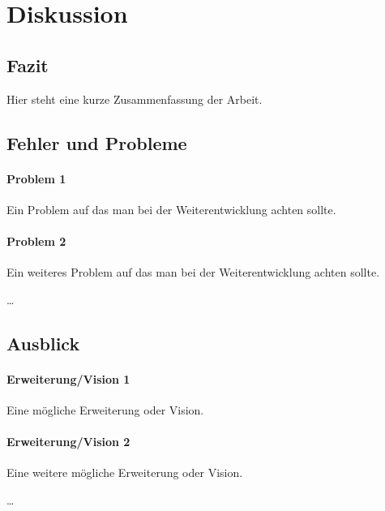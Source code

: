 

\section{Diskussion}


	\subsection{Fazit}
	
	Hier steht eine kurze Zusammenfassung der Arbeit.
	

	\subsection{Fehler und Probleme}
	
		\paragraph{Problem 1}
		Ein Problem auf das man bei der Weiterentwicklung achten sollte.
		
		\paragraph{Problem 2} 
		Ein weiteres Problem auf das man bei der Weiterentwicklung achten sollte.
		
		\dots
		
	
	
	\subsection{Ausblick}

		\paragraph{Erweiterung/Vision 1}
		Eine mögliche Erweiterung oder Vision.
		
		\paragraph{Erweiterung/Vision 2}
		Eine weitere mögliche Erweiterung oder Vision.
		
		\dots










	